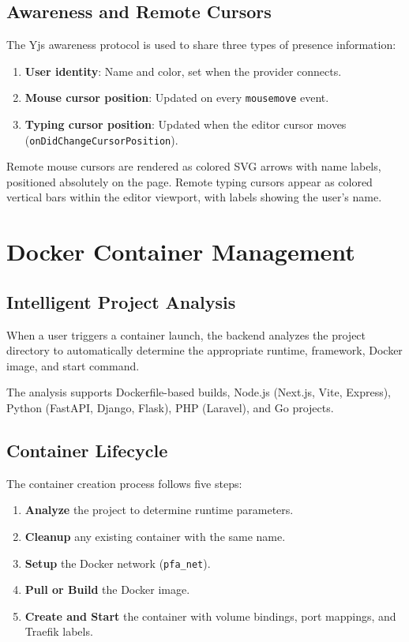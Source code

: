\documentclass[12pt,a4paper,oneside]{report}
\begin{document}
\subsection{Awareness and Remote Cursors}

The Yjs awareness protocol is used to share three types of presence information:

\begin{enumerate}
    \item \textbf{User identity}: Name and color, set when the provider connects.
    \item \textbf{Mouse cursor position}: Updated on every \texttt{mousemove} event.
    \item \textbf{Typing cursor position}: Updated when the editor cursor moves (\texttt{onDidChangeCursorPosition}).
\end{enumerate}


Remote mouse cursors are rendered as colored SVG arrows with name labels, positioned absolutely on the page. Remote typing cursors appear as colored vertical bars within the editor viewport, with labels showing the user's name.

\section{Docker Container Management}

\subsection{Intelligent Project Analysis}

When a user triggers a container launch, the backend analyzes the project directory to automatically determine the appropriate runtime, framework, Docker image, and start command.

The analysis supports Dockerfile-based builds, Node.js (Next.js, Vite, Express), Python (FastAPI, Django, Flask), PHP (Laravel), and Go projects.

\subsection{Container Lifecycle}

The container creation process follows five steps:

\begin{enumerate}[label=\arabic*.]
    \item \textbf{Analyze} the project to determine runtime parameters.
    \item \textbf{Cleanup} any existing container with the same name.
    \item \textbf{Setup} the Docker network (\texttt{pfa\_net}).
    \item \textbf{Pull or Build} the Docker image.
    \item \textbf{Create and Start} the container with volume bindings, port mappings, and Traefik labels.
\end{enumerate}
\end{document}
